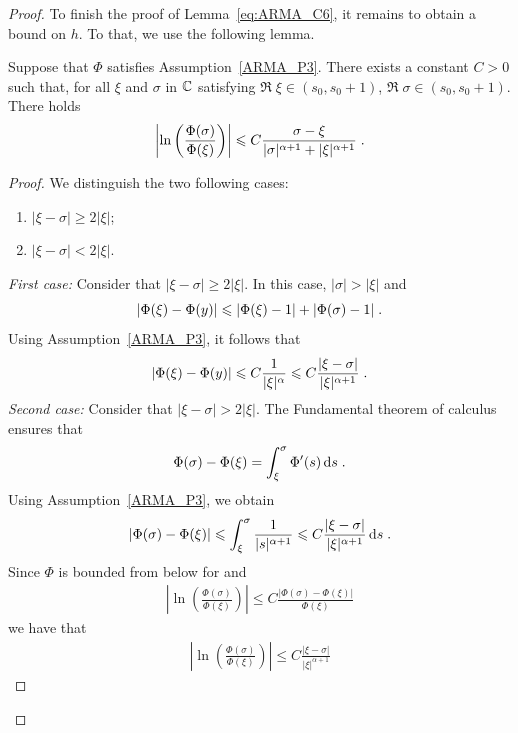 \begin{proof}
To finish the proof of Lemma~\ref{eq:ARMA_C6}, it remains to obtain a bound on $h$. To that, we use the following lemma. 
\begin{lemma}
    \label{ARMA_lmC7}Suppose that $\Phi$ satisfies Assumption~\ref{ARMA_P3}. 
    There exists a constant $C > 0$ such that, for all $\xi$ and $\sigma$ in $\mathbb{C}$ satisfying $\Re\;\xi \in (s_0, s_0+1)$, $\Re\;\sigma \in (s_0, s_0+1)$. There holds
    \begin{align*}
        \left| 
        \ln
        \left(
            \frac{\Phi(\sigma)}{\Phi(\xi)}
        \right)
        \right|
            \leqslant
            C
            \frac{\sigma-\xi}{|\sigma|^{\alpha+1} + |\xi|^{\alpha+1}}    
            \; .    
    \end{align*} 

\end{lemma}
\begin{proof}
    We distinguish the two following cases:
    \begin{enumerate}
        \item $|\xi - \sigma| \geq 2 |\xi|$;
        \item $|\xi - \sigma| < 2 |\xi|$.
    \end{enumerate}
\textit{First case:} Consider that $|\xi - \sigma| \geq 2 |\xi|$. In this case, $|\sigma| > |\xi|$ and 
\begin{equation*}
    |\Phi(\xi) - \Phi(y)| \leqslant |\Phi(\xi) - 1| + |\Phi(\sigma) - 1| \; .
\end{equation*}
Using Assumption~\ref{ARMA_P3}, it follows that 
\begin{equation*}
    |\Phi(\xi) - \Phi(y)|
    \leqslant C \frac{1}{|\xi|^\alpha}
    \leqslant C \frac{|\xi - \sigma|}{|\xi|^{\alpha+1}}
    \; .
\end{equation*}
\textit{Second case:} Consider that $|\xi - \sigma| > 2 |\xi|$. The Fundamental theorem of calculus ensures that 
\begin{align*}
    \Phi(\sigma)-\Phi(\xi) = \int_\xi^\sigma \Phi'(s) \,\mathrm{d} s\; .
\end{align*}
Using Assumption~\ref{ARMA_P3}, we obtain
\begin{align*}
    |\Phi(\sigma)-\Phi(\xi)| 
    \leqslant \int_\xi^\sigma \frac{1}{|s|^{\alpha+1}}
    \leqslant  C \frac{|\xi - \sigma|}{|\xi|^{\alpha+1}}
    \,\mathrm{d} s\; .
\end{align*}
Since $\Phi$ is bounded from below for and 
\begin{align*}
    \left|
    \ln
    \left(
        \frac{\Phi(\sigma)}{\Phi(\xi)}
    \right)
    \right|
    \leq C \frac{|\Phi(\sigma) - \Phi(\xi)|}{\Phi(\xi)}
\end{align*}
we have that 
\begin{align*}
    \left|
    \ln
    \left(
        \frac{\Phi(\sigma)}{\Phi(\xi)}
    \right)
    \right|
    \leq 
    C \frac{|\xi - \sigma|}{|\xi|^{\alpha+1}}
\end{align*}
\end{proof}


\end{proof}
